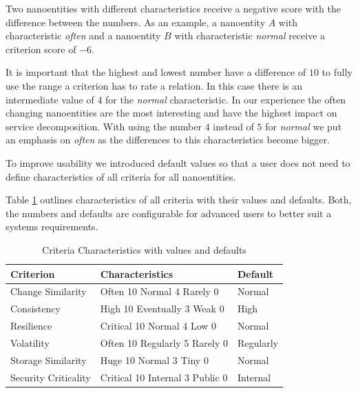 Two nanoentities with different characteristics receive a negative score with the difference between the numbers. As an example, a nanoentity $A$ with characteristic \textit{often} and a nanoentity $B$ with characteristic \textit{normal} receive a criterion score of $-6$. 

It is important that the highest and lowest number have a difference of $10$ to fully use the range a criterion has to rate a relation. \newline In this case there is an intermediate value of $4$ for the \textit{normal} characteristic. In our experience the often changing nanoentities are the most interesting and have the highest impact on service decomposition. With using the number $4$ instead of $5$ for \textit{normal} we put an emphasis on \textit{often} as the differences to this characteristics become bigger. 

To improve usability we introduced default values so that a user does not need to define characteristics of all criteria for all nanoentities. 

Table \ref{tab:characteristics} outlines characteristics of all criteria with their values and defaults. Both, the numbers and defaults are configurable for advanced users to better suit a systems requirements. 

\begin{table}[H]
	\centering
	\caption{Criteria Characteristics with values and defaults}
	\label{tab:characteristics}
	\begin{tabular}{|p{100pt}|p{80pt}|p{60pt}|}
		\hline	
		\textbf Criterion & Characteristics & Default\\
		\hline
		Change Similarity & Often 10 \newline Normal 4 \newline Rarely 0 & Normal\\
		\hline
		Consistency & High 10 \newline Eventually 3 \newline Weak 0 & High\\
		\hline
		Resilience & Critical 10 \newline Normal 4 \newline Low 0 & Normal\\
		\hline
		Volatility & Often 10 \newline Regularly 5 \newline Rarely 0 & Regularly \\
		\hline
		Storage Similarity & Huge 10 \newline Normal 3 \newline Tiny 0 & Normal\\
		\hline
		Security Criticality & Critical 10 \newline Internal 3 \newline Public 0 & Internal\\
		\hline
	\end{tabular}
\end{table}


